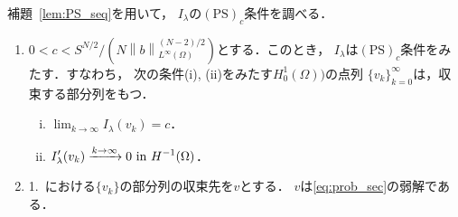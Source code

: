 補題~\ref{lem:PS_seq}を用いて，
$I_\lambda$の$(\mathrm{PS})_c$条件を調べる．

\begin{lem} \label{lem:PS_c}
 \begin{enumerate}[1.] \sage
  \item  $0 < c < S^{N/2}/(N\left\| b \right\|_{L^\infty(\Omega)}
         ^{(N-2)/2})$とする．このとき，
         $I_\lambda$は$(\mathrm{PS})_c$条件をみたす．すなわち，
         次の条件(i), (ii)をみたす$H_0^1(\Omega))$の点列
         $\{ v_k \}_{k = 0}^\infty$は，収束する部分列をもつ．
         \begin{enumerate}[(i)]
          \item $\displaystyle \lim_{k \to \infty} I_\lambda (v_k) = c$．
          \item $\displaystyle I^\prime_\lambda (v_k) \xrightarrow{k \to
                \infty} 0 ~\text{in}~ H^{-1}(\Omega)$．
         \end{enumerate}
  \item 1.~における$\{ v_k \}$の部分列の収束先を$v$とする．
        $v$は\ref{eq:prob_sec}の弱解である．
 \end{enumerate}
\end{lem}

